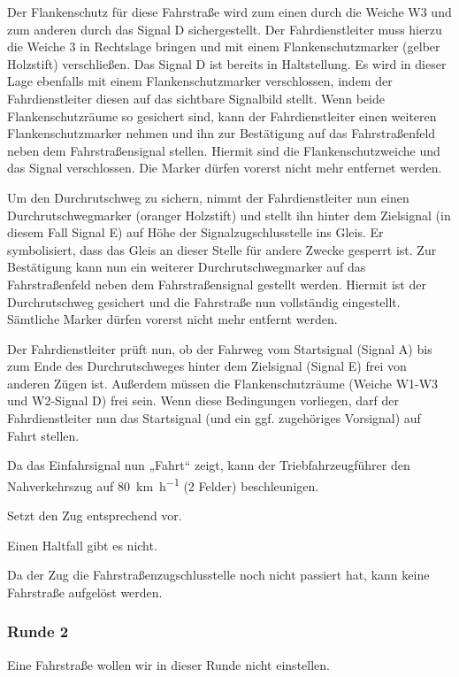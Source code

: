    Der Flankenschutz für diese Fahrstraße wird zum einen durch die Weiche W3 und zum anderen durch das Signal D sichergestellt. Der Fahrdienstleiter muss hierzu die Weiche 3 in Rechtslage bringen und mit einem Flankenschutzmarker (gelber Holzstift) verschließen. Das Signal D ist bereits in Haltstellung. Es wird in dieser Lage ebenfalls mit einem Flankenschutzmarker verschlossen, indem der Fahrdienstleiter diesen auf das sichtbare Signalbild stellt. Wenn beide Flankenschutzräume so gesichert sind, kann der Fahrdienstleiter einen weiteren Flankenschutzmarker nehmen und ihn zur Bestätigung auf das Fahrstraßenfeld neben dem Fahrstraßensignal stellen. Hiermit sind die Flankenschutzweiche und das Signal verschlossen. Die Marker dürfen vorerst nicht mehr entfernet werden.

   Um den Durchrutschweg zu sichern, nimmt der Fahrdienstleiter nun einen Durchrutschwegmarker (oranger Holzstift) und stellt ihn hinter dem Zielsignal (in diesem Fall Signal E) auf Höhe der Signalzugschlusstelle ins Gleis. Er symbolisiert, dass das Gleis an dieser Stelle für andere Zwecke gesperrt ist. Zur Bestätigung kann nun ein weiterer Durchrutschwegmarker auf das Fahrstraßenfeld neben dem Fahrstraßensignal gestellt werden. Hiermit ist der Durchrutschweg gesichert und die Fahrstraße nun vollständig eingestellt. Sämtliche Marker dürfen vorerst nicht mehr entfernt werden.

   Der Fahrdienstleiter prüft nun, ob der Fahrweg vom Startsignal (Signal A) bis zum Ende des Durchrutschweges hinter dem Zielsignal (Signal E) frei von anderen Zügen ist. Außerdem müssen die Flankenschutzräume (Weiche W1-W3 und W2-Signal D) frei sein. Wenn diese Bedingungen vorliegen, darf der Fahrdienstleiter nun das Startsignal (und ein ggf. zugehöriges Vorsignal) auf Fahrt stellen.

   Da das Einfahrsignal nun „Fahrt“ zeigt, kann der Triebfahrzeugführer den Nahverkehrszug auf \SI{80}{\kilo\metre\per\hour} (2 Felder) beschleunigen.

   Setzt den Zug entsprechend vor.

   Einen Haltfall gibt es nicht.

   Da der Zug die Fahrstraßenzugschlusstelle noch nicht passiert hat, kann keine Fahrstraße aufgelöst werden.


\subsubsection*{Runde 2}
   Eine Fahrstraße wollen wir in dieser Runde nicht einstellen.

